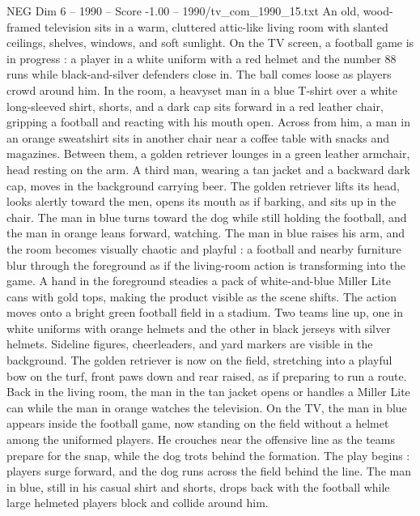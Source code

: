 \begin{textsample}{NEG Dim 6 – 1990 – Score -1.00 – 1990/tv\_com\_1990\_15.txt}  \label{ex:f6_neg_027}
An old, wood-framed television sits in a warm, cluttered attic-like living room with slanted ceilings, shelves, windows, and soft sunlight.
On the TV screen, a football game is in progress : a player in a white uniform with a red helmet and the number 88 runs while black-and-silver defenders close in.
The ball comes loose as players crowd around him.
In the room, a heavyset man in a blue T-shirt over a white long-sleeved shirt, shorts, and a dark cap sits forward in a red leather chair, gripping a football and reacting with his mouth open.
Across from him, a man in an orange sweatshirt sits in another chair near a coffee table with snacks and magazines.
Between them, a golden retriever lounges in a green leather armchair, head resting on the arm.
A third man, wearing a tan jacket and a backward dark cap, moves in the background carrying beer.
The golden retriever lifts its head, looks alertly toward the men, opens its mouth as if barking, and sits up in the chair.
The man in blue turns toward the dog while still holding the football, and the man in orange leans forward, watching.
The man in blue raises his arm, and the room becomes visually chaotic and playful : a football and nearby furniture blur through the foreground as if the living-room action is transforming into the game.
A hand in the foreground steadies a pack of white-and-blue Miller Lite cans with gold tops, making the product visible as the scene shifts.
The action moves onto a bright green football field in a stadium.
Two teams line up, one in white uniforms with orange helmets and the other in black jerseys with silver helmets.
Sideline figures, cheerleaders, and yard markers are visible in the background.
The golden retriever is now on the field, stretching into a playful bow on the turf, front paws down and rear raised, as if preparing to run a route.
Back in the living room, the man in the tan jacket opens or handles a Miller Lite can while the man in orange watches the television.
On the TV, the man in blue appears inside the football game, now standing on the field without a helmet among the uniformed players.
He crouches near the offensive line as the teams prepare for the snap, while the dog trots behind the formation.
The play begins : players surge forward, and the dog runs across the field behind the line.
The man in blue, still in his casual shirt and shorts, drops back with the football while large helmeted players block and collide around him.

\end{textsample}
